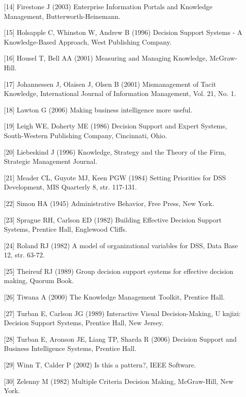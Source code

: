 [14] Firestone J (2003) Enterprise Information Portals and Knowledge Management, Butterworth-Heinemann.

[15] Holsapple C, Whinston W, Andrew B (1996) Decision Support Systems - A Knowledge-Based Approach, West Publishing Company.

[16] Housel T, Bell AA (2001) Measuring and Managing Knowledge, McGraw-Hill.

[17] Johannessen J, Olaisen J, Olsen B (2001) Mismanagement of Tacit Knowledge, International Journal of Information Management, Vol. 21, No. 1.

[18] Lawton G (2006) Making business intelligence more useful.

[19] Leigh WE, Doherty ME (1986) Decision Support and Expert Systems, South-Western Publishing Company, Cincinnati, Ohio.

[20] Liebeskind J (1996) Knowledge, Strategy and the Theory of the Firm, Strategic Management Journal.

[21] Meader CL, Guyote MJ, Keen PGW (1984) Setting Priorities for DSS Development, MIS Quarterly 8, str. 117-131.

[22] Simon HA (1945) Administrative Behavior, Free Press, New York.

[23] Sprague RH, Carlson ED (1982) Building Effective Decision Support Systems, Prentice Hall, Englewood Cliffs.

[24] Roland RJ (1982) A model of organizational variables for DSS, Data Base 12, str. 63-72.

[25] Theireuf RJ (1989) Group decision support systems for effective decision making, Quorum Book.

[26] Tiwana A (2000) The Knowledge Management Toolkit, Prentice Hall.

[27] Turban E, Carlson JG (1989) Interactive Visual Decision-Making, U knjizi: Decision Support Systems, Prentice Hall, New Jersey.

[28] Turban E, Aronson JE, Liang TP, Sharda R (2006) Decision Support and Business Intelligence Systems, Prentice Hall.

[29] Winn T, Calder P (2002) Is this a pattern?, IEEE Software.

[30] Zelenny M (1982) Multiple Criteria Decision Making, McGraw-Hill, New York.
